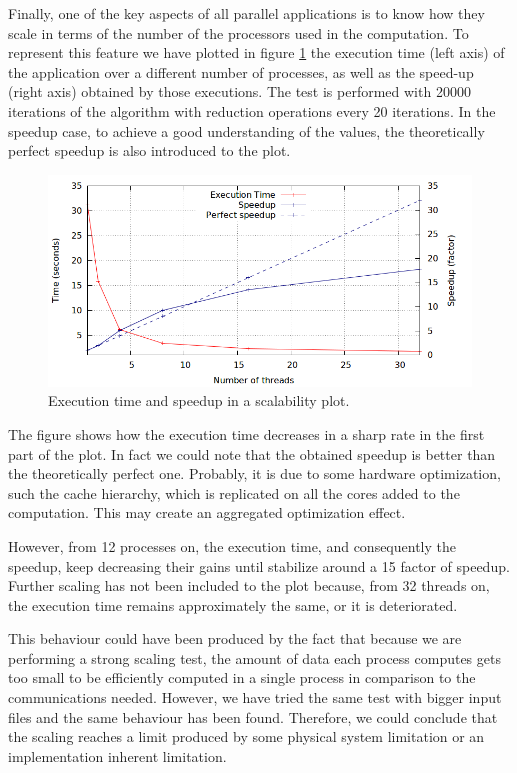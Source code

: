 \documentclass[12pt, a4paper, oneside]{article}
\begin{document}
Finally, one of the key aspects of all parallel applications is to know how they scale in terms of the number of the processors used in the computation.
To represent this feature we have plotted in figure \ref{figure:scale} the execution time (left axis) of the application over a different number of processes, as well as the speed-up (right axis) obtained by those executions. The test is performed with 20000 iterations of the algorithm with reduction operations every 20 iterations.
In the speedup case, to achieve a good understanding of the values, the theoretically perfect speedup is also introduced to the plot.
\begin{figure}[htbp]
 \centering
 \includegraphics[width=\textwidth]{plots/scalability}
 \caption{Execution time and speedup in a scalability plot.}
 \label{figure:scale}
\end{figure}
The figure shows how the execution time decreases in a sharp rate in the first
part of the plot.  In fact we could note that the obtained speedup is better
than the theoretically perfect one.  Probably, it is due to some hardware
optimization, such the cache hierarchy, which is replicated on all the cores
added to the computation.  This may create an aggregated optimization effect.

However, from 12 processes on, the execution time, and consequently the speedup, keep decreasing their gains until stabilize around a 15 factor of speedup.
Further scaling has not been included to the plot because, from 32 threads on, the execution time remains approximately the same, or it is deteriorated.

This behaviour could have been produced by the fact that because we are performing a strong scaling test, the amount of data each process computes gets too small to be efficiently computed in a single process in comparison to the communications needed. However, we have tried the same test with bigger input files and the same behaviour has been found.
Therefore, we could conclude that the scaling reaches a limit produced by some physical system limitation or an implementation inherent limitation.
 
\end{document}

